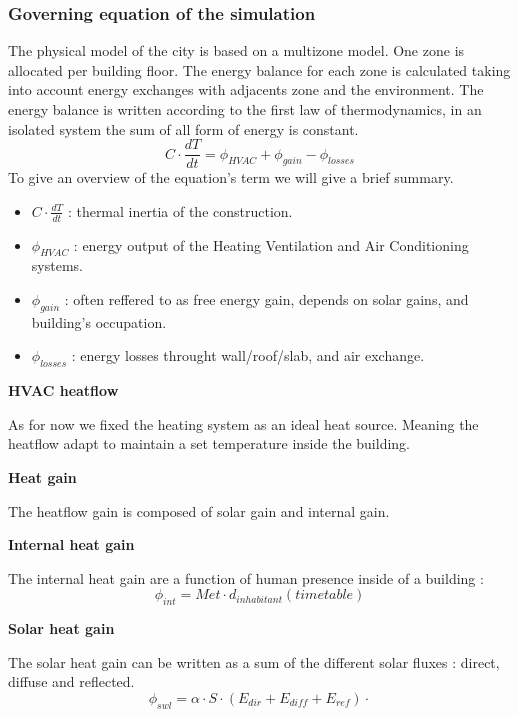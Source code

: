 \documentclass[runningheads]{llncs}
\begin{document}
\subsubsection{Governing equation of the simulation}
The physical model of the city is based on a multizone model. One zone is allocated per building floor. The energy balance for each zone is calculated taking into account energy exchanges with adjacents zone and the environment.
The energy balance is written according to the first law of thermodynamics, in an isolated system the sum of all form of energy is constant.
\begin{equation}
    C\cdot \frac{dT}{dt}=\phi_{HVAC}+\phi_{gain}-\phi_{losses}
\end{equation}
To give an overview of the equation's term we will give a brief summary.
\begin{itemize}
  \item $C\cdot \frac{dT}{dt}$ : thermal inertia of the construction. 
  \item $\phi_{HVAC}$ : energy output of the Heating Ventilation and Air Conditioning systems. 
  \item $\phi_{gain}$ : often reffered to as free energy gain, depends on solar gains, and building's occupation.
  \item $\phi_{losses}$ : energy losses throught wall/roof/slab, and air exchange.
\end{itemize}



\textbf{HVAC heatflow}

As for now we fixed the heating system as an ideal heat source.
Meaning the heatflow adapt to maintain a set temperature inside the building.

\textbf{Heat gain}

The heatflow gain is composed of solar gain and internal gain.

\textbf{Internal heat gain}
  
The internal heat gain are a function of human presence inside of a building :
\begin{equation}
  \phi_{int}=Met\cdot d_{inhabitant}(timetable)
\end{equation}

\textbf{Solar heat gain}
  
The solar heat gain can be written as a sum of the different solar fluxes : direct, diffuse and reflected.
\begin{equation}
  \phi_{swl}=\alpha\cdot S\cdot(E_{dir}+E_{diff}+E_{ref})\cdot 
\end{equation}
\end{document}
